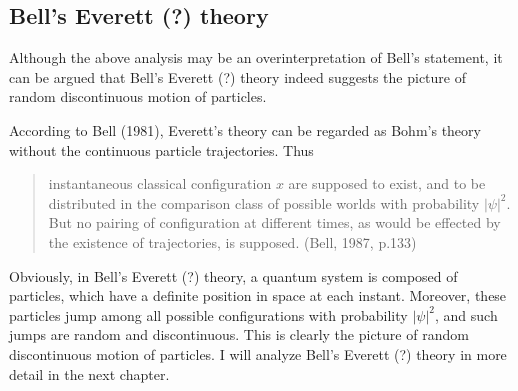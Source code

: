 
\subsection{Bell's Everett (?) theory}

Although the above analysis may be an overinterpretation of Bell's statement, it can be argued that Bell's Everett (?) theory indeed suggests the picture of random discontinuous motion of particles.

According to Bell (1981), Everett's theory can be regarded as Bohm's theory without the continuous particle trajectories. Thus

\begin{quote}
instantaneous classical configuration $x$ are supposed to exist, and to be distributed in the comparison class of possible worlds with probability $|\psi|^2$. But no pairing of configuration at different times, as would be effected by the existence of trajectories, is supposed. (Bell, 1987, p.133)
\end{quote}

Obviously, in Bell's Everett (?) theory, a quantum system is composed of particles, which have a definite position in space at each instant. Moreover, these particles jump among all possible configurations with probability $|\psi|^2$, and such jumps are random and discontinuous. This is clearly the picture of  random discontinuous motion of particles. I will analyze Bell's Everett (?) theory in more detail in the next chapter.


